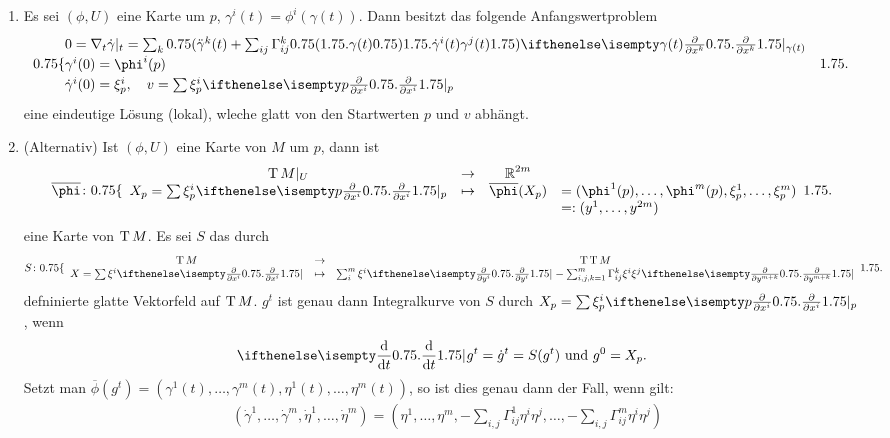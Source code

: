 \begin{bew}\begin{enumerate}[label=(\Alph*),leftmargin=*,widest=B]
\item
	Es sei $(\phi, U)$ eine Karte um $p$, $\gamma^i(t) = \phi^i(\gamma(t))$. Dann besitzt das folgende Anfangswertproblem
	\begin{align*}
		\begin{cases}
			0 = \nabla_t\dot \gamma|_t = \sum_k\left(\ddot \gamma^k(t) + \sum_{ij}\Gamma_{ij}^k\big(\gamma(t)\big)\dot \gamma^i(t)\gamma^j(t)\right) \pdifffrac[\gamma(t)]{}{x^k}\\
			\gamma^i(0) = \phi^i(p)\\
			\dot\gamma^i(0) = \xi_p^i, \quad v = \sum \xi^i_p\pdifffrac[p]{}{x^i}
		\end{cases}
	\end{align*}
	eine eindeutige Lösung (lokal), wleche glatt von den Startwerten $p$ und $v$ abhängt.
\item
	(Alternativ) Ist $(\phi, U)$ eine Karte von $M$ um $p$, dann ist
	\[ \overline \phi \colon \left\{\begin{array}{cccl}
		\T M|_U &\to& \R^{2m}&\\
		X_p=\sum \xi_p^i\pdifffrac[p]{}{x^i} &\mapsto& \overline\phi(X_p) &= (\phi^1(p), \ldots, \phi^m(p), \xi_p^1, \ldots, \xi_p^m)\\
		&&& =: (y^1, \ldots, y^{2m})
	\end{array}\right.\]
	eine Karte von $\operatorname{T} M$.	
	Es sei $S$ das durch
	\[ S \colon \left\{ \begin{array}{ccc}
		\T M &\to& \T\T M\\
		X = \sum \xi^i \pdifffrac{}{x^i} &\mapsto& \sum_i^m \xi^i \pdifffrac{}{y^i} - \sum_{i,j,k=1}^{m} \Gamma_{ij}^k \xi^i\xi^j\pdifffrac{}{y^{m+k}}
	\end{array}\right.\]
	defninierte glatte Vektorfeld auf $\operatorname{T} M$.	
	$g^t$ ist genau dann Integralkurve von $S$ durch $X_p = \sum \xi_p^i\pdifffrac[p]{}{x^i}$, wenn
	\begin{align*}
		\difffrac{}{t}g^t = \dot g^t = S(g^t) \text{ und } g^0 = X_p.
	\end{align*}
	Setzt man $\overline \phi(g^t) = (\gamma^1(t), \ldots, \gamma^m(t),\eta^1(t), \ldots, \eta^m(t))$, so ist dies genau dann der Fall, wenn gilt:
	\begin{align*}
		& (\dot\gamma^1,\ldots, \dot\gamma^m,\dot\eta^1,\ldots, \dot\eta^m) = \left(\eta^1, \ldots, \eta^m, -\sum_{i,j}\Gamma_{ij}^1\eta^i\eta^j, \ldots, -\sum_{i,j}\Gamma_{ij}^m\eta^i\eta^j\right)\\

\end{align*}
\end{enumerate}
\end{bew}
